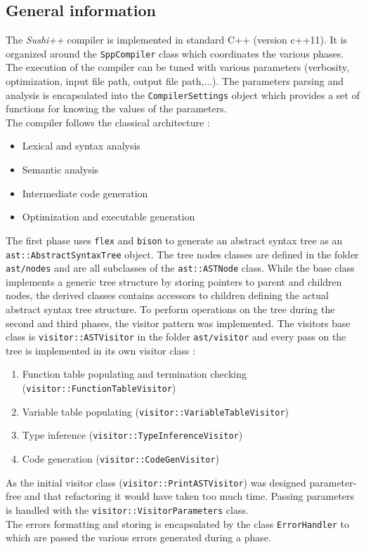 \documentclass[a4paper,11pt]{article}
\begin{document}
\subsection{General information}
The \textit{Sushi++} compiler is implemented in standard C++ (version c++11). It is organized around the \texttt{SppCompiler} class which coordinates the various phases. The execution of the compiler can be tuned with various parameters (verbosity, optimization, input file path, output file path,...). The parameters parsing and analysis is encapsulated into the \texttt{CompilerSettings} object which provides a set of functions for knowing the values of the parameters. \\
The compiler follows the classical architecture :
\begin{itemize}
	\item Lexical and syntax analysis
	\item Semantic analysis
	\item Intermediate code generation
	\item Optimization and executable generation
\end{itemize}
The first phase uses \texttt{flex} and \texttt{bison} to generate an abstract syntax tree as an \texttt{ast::AbstractSyntaxTree} object. The tree nodes  classes are defined in the folder \texttt{ast/nodes} and are all subclasses of the \texttt{ast::ASTNode} class. While the base class implements a generic tree structure by storing pointers to parent and children nodes, the derived classes contains accessors to children defining the actual abstract syntax tree structure. To perform operations on the tree during the second and third phases, the visitor pattern was implemented. The visitors base class is \texttt{visitor::ASTVisitor} in the folder \texttt{ast/visitor} and every pass on the tree is implemented in its own visitor class :
\begin{enumerate}
	\item Function table populating and termination checking (\texttt{visitor::FunctionTableVisitor})
	\item Variable table populating (\texttt{visitor::VariableTableVisitor})
	\item Type inference (\texttt{visitor::TypeInferenceVisitor})
	\item Code generation (\texttt{visitor::CodeGenVisitor})
\end{enumerate}
As the initial visitor class (\texttt{visitor::PrintASTVisitor}) was designed parameter-free and that refactoring it would have taken too much time. Passing parameters is handled with the \texttt{visitor::VisitorParameters} class.  \\ 
The errors formatting and storing is encapsulated by the class \texttt{ErrorHandler} to which are passed the various errors generated during a phase.
\end{document}
